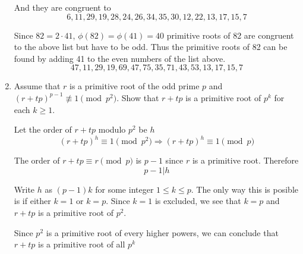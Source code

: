 \documentclass[12pt]{exam}
\theoremstyle{definition}
\begin{document}
\begin{enumerate}
\begin{answer}
            And they are congruent to 
            \[
                  6, 11, 29, 19, 28, 24, 26, 34, 35, 30, 12, 22, 13, 17, 15, 7
            \]


            Since $82 = 2 \cdot 41$, $\phi(82) = \phi(41) = 40$ primitive roots of 82 are congruent to the above list but have to be odd.
            Thus the primitive roots of 82 can be found by adding 41 to the even numbers of the list above.
            \[
                  47, 11, 29, 19, 69, 47, 75, 35, 71, 43, 53, 13, 17, 15, 7
            \]

      \end{answer}

      \setcounter{enumi}{6}
      \item Assume that $r$ is a primitive root of the odd prime $p$ and ${(r + tp)}^{p-1} \not\equiv 1 \pmod {p^2}$. 
      Show that $r + tp$ is a primitive root of $p^k$ for each $k \geq 1$. 
      \begin{answer}
            Let the order of $r + tp$ modulo $p^2$ be $h$
            \[
                  {(r+tp)}^h \equiv 1 \pmod {p^2} \Rightarrow {(r+tp)}^h \equiv 1 \pmod {p}
            \]

            The order of $r + tp \equiv r \pmod p$ is $p-1$ since $r$ is a primitive root. Therefore
            \[
                  p - 1 | h
            \]

            Write $h$ as $(p-1) k$ for some integer $1 \leq k \leq p$. The only way this is posible is if either $k = 1$ or $k = p$.
            Since $k = 1$ is excluded, we see that $k = p$ and $r + tp$ is a primitive root of $p^2$.

            Since $p^2$ is a primitive root of every higher powers, we can conclude that $r + tp$ is a primitive root of all $p^k$
      \end{answer}

\end{enumerate}
\end{document}
